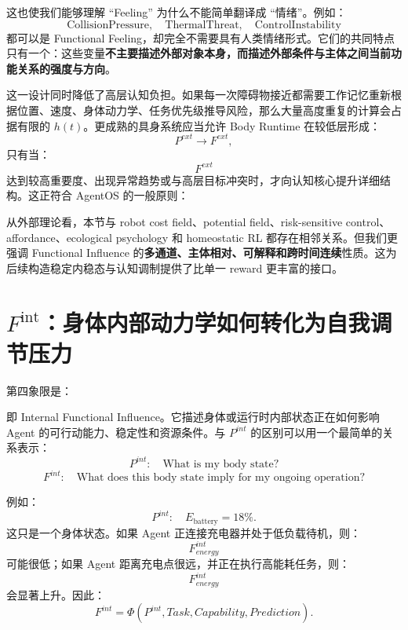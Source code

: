 这也使我们能够理解 ``Feeling'' 为什么不能简单翻译成 ``情绪''。例如：
\[
\mathrm{CollisionPressure},
\quad
\mathrm{ThermalThreat},
\quad
\mathrm{ControlInstability}
\]
都可以是 Functional Feeling，却完全不需要具有人类情绪形式。它们的共同特点只有一个：这些变量\textbf{不主要描述外部对象本身，而描述外部条件与主体之间当前功能关系的强度与方向}。

这一设计同时降低了高层认知负担。如果每一次障碍物接近都需要工作记忆重新根据位置、速度、身体动力学、任务优先级推导风险，那么大量高度重复的计算会占据有限的 $h(t)$。更成熟的具身系统应当允许 Body Runtime 在较低层形成：
\[
P^{ext}
\rightarrow
F^{ext},
\]
只有当：
\[
F^{ext}
\]
达到较高重要度、出现异常趋势或与高层目标冲突时，才向认知核心提升详细结构。这正符合 AgentOS 的一般原则：
\begin{statementbox}
\centering
{}
\end{statementbox}

从外部理论看，本节与 robot cost field、potential field、risk-sensitive control、affordance、ecological psychology 和 homeostatic RL 都存在相邻关系。但我们更强调 Functional Influence 的\textbf{多通道、主体相对、可解释和跨时间连续}性质。这为后续构造稳定内稳态与认知调制提供了比单一 reward 更丰富的接口。

\section{$F^{\mathrm{int}}$：身体内部动力学如何转化为自我调节压力}
\label{sec:internal-functional-influence}

第四象限是：
\begin{statementbox}
\centering
{}
\end{statementbox}
即 Internal Functional Influence。它描述身体或运行时内部状态正在如何影响 Agent 的可行动能力、稳定性和资源条件。与 $P^{int}$ 的区别可以用一个最简单的关系表示：
\[
P^{int}
:
\quad
\text{What is my body state?}
\]
\[
F^{int}
:
\quad
\text{What does this body state imply for my ongoing operation?}
\]

例如：
\[
P^{int}
:
\quad
E_{\mathrm{battery}}=18\%.
\]
这只是一个身体状态。如果 Agent 正连接充电器并处于低负载待机，则：
\[
F^{int}_{energy}
\]
可能很低；如果 Agent 距离充电点很远，并正在执行高能耗任务，则：
\[
F^{int}_{energy}
\]
会显著上升。因此：
\[
F^{int}
=
\Phi(
P^{int},
Task,
Capability,
Prediction
).
\]

